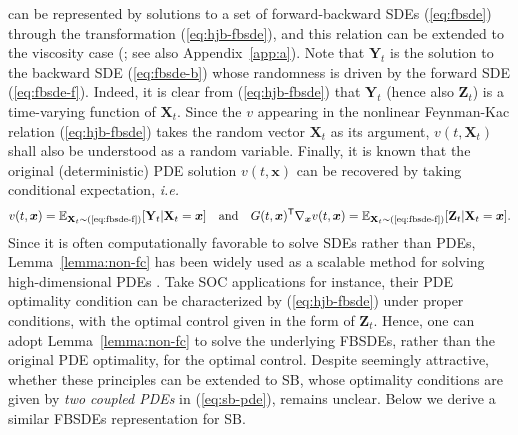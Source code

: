 \documentclass{article}
\def\eqref#1{(\ref{#1})}
\def\rvX{{\mathbf{X}}}
\def\rvY{{\mathbf{Y}}}
\def\rvZ{{\mathbf{Z}}}
\def\vx{{\bm{x}}}
\newcommand{\E}{\mathbb{E}}
\newcommand{\T}{\mathsf{T}}
\newcommand{\ie}{{\ignorespaces\emph{i.e.}}{ }}
\begin{document}
can be represented by solutions to a set of forward-backward SDEs \eqref{eq:fbsde}
through the transformation \eqref{eq:hjb-fbsde},
  and this relation can be extended to the viscosity case (\citet{pardoux1992backward}; see also {Appendix~\ref{app:a}}).
  Note that
  $\rvY_t$ is the solution to the backward SDE \eqref{eq:fbsde-b} whose
  randomness is driven by the forward SDE \eqref{eq:fbsde-f}.
  Indeed, it is clear from \eqref{eq:hjb-fbsde} that $\rvY_t$ (hence also $\rvZ_t$)
  is a time-varying function of  $\rvX_t$.
  Since the $v$ appearing in the nonlinear Feynman-Kac relation \eqref{eq:hjb-fbsde}
  takes the random vector $\rvX_t$ as its argument,
  $v(t,\rvX_t)$ shall also be understood as a random variable.
  Finally, it is known that the original (deterministic) PDE solution $v(t,\vx)$ can be recovered by taking conditional expectation, \ie
  \begin{align}
    v(t,\vx) = \E_{\rvX_t\sim\text{\eqref{eq:fbsde-f}}}[\rvY_t | \rvX_t = \vx]
    \quad\text{and}\quad
    G(t,\vx)^\T \nabla_\vx v(t,\vx) = \E_{\rvX_t\sim\text{\eqref{eq:fbsde-f}}}[\rvZ_t | \rvX_t = \vx].
  \end{align}Since it is often computationally favorable to solve SDEs rather than PDEs,
Lemma~\ref{lemma:non-fc} has been widely used as a scalable method for solving high-dimensional PDEs \citep{han2018solving,pereira2019neural}.
Take SOC applications for instance,
their PDE optimality condition
can be characterized by \eqref{eq:hjb-fbsde} under proper conditions,
with the optimal control given in the form of $\rvZ_t$.
Hence,
one can adopt Lemma~\ref{lemma:non-fc} to solve the underlying FBSDEs, rather than the original PDE optimality, for the optimal control.
Despite seemingly attractive,
whether these principles can be extended to SB,
whose optimality conditions are given by \textit{two coupled PDEs} in \eqref{eq:sb-pde},
remains unclear.
Below we derive a similar FBSDEs representation for SB.
\end{document}
